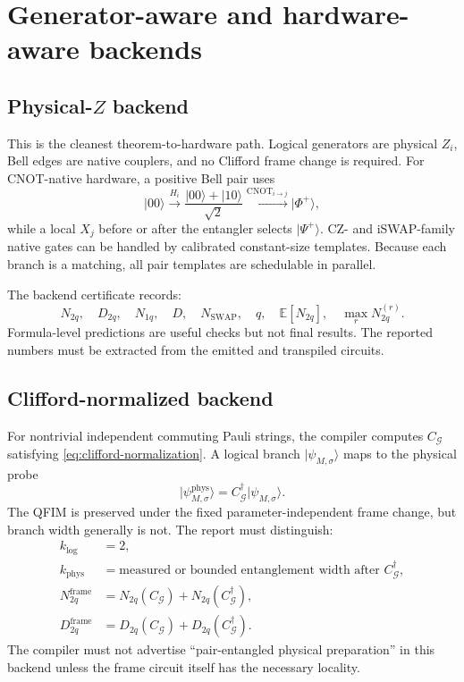 \documentclass[11pt]{article}
\theoremstyle{definition}
\theoremstyle{remark}
\newcommand{\G}{\mathcal{G}}
\newcommand{\phys}{\mathrm{phys}}
\newcommand{\logical}{\mathrm{log}}
\newcommand{\ket}[1]{\lvert #1\rangle}
\begin{document}
\section{Generator-aware and hardware-aware backends}

\subsection{\texorpdfstring{Physical-$Z$ backend}{Physical-Z backend}}
This is the cleanest theorem-to-hardware path. Logical generators are physical $Z_i$, Bell edges are native couplers, and no Clifford frame change is required. For CNOT-native hardware, a positive Bell pair uses
\begin{equation}
  \ket{00}\xrightarrow{H_i}\frac{\ket{00}+\ket{10}}{\sqrt2}
  \xrightarrow{\mathrm{CNOT}_{i\to j}}\ket{\Phi^+},
\end{equation}
while a local $X_j$ before or after the entangler selects $\ket{\Psi^+}$. CZ- and iSWAP-family native gates can be handled by calibrated constant-size templates. Because each branch is a matching, all pair templates are schedulable in parallel.

The backend certificate records:
\begin{equation}
  N_{2q},\quad D_{2q},\quad N_{1q},\quad D,\quad
  N_{\mathrm{SWAP}},\quad q,\quad
  \mathbb E[N_{2q}],\quad\max_rN_{2q}^{(r)}.
\end{equation}
Formula-level predictions are useful checks but not final results. The reported numbers must be extracted from the emitted and transpiled circuits.

\subsection{Clifford-normalized backend}
For nontrivial independent commuting Pauli strings, the compiler computes $C_{\G}$ satisfying \cref{eq:clifford-normalization}. A logical branch $\ket{\psi_{M,\sigma}}$ maps to the physical probe
\begin{equation}
  \ket{\psi^{\phys}_{M,\sigma}}
  =C_{\G}^{\dagger}\ket{\psi_{M,\sigma}}.
  \label{eq:physical-mapped-state}
\end{equation}
The QFIM is preserved under the fixed parameter-independent frame change, but branch width generally is not. The report must distinguish:
\begin{align}
  k_{\logical}&=2,\\
  k_{\phys}&=\text{measured or bounded entanglement width after }C_{\G}^{\dagger},\\
  N_{2q}^{\mathrm{frame}}&=N_{2q}(C_{\G})+N_{2q}(C_{\G}^{\dagger}),\\
  D_{2q}^{\mathrm{frame}}&=D_{2q}(C_{\G})+D_{2q}(C_{\G}^{\dagger}).
\end{align}
The compiler must not advertise ``pair-entangled physical preparation'' in this backend unless the frame circuit itself has the necessary locality.
\end{document}
